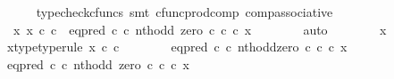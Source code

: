 \begin{isabellebody}
\ \ \ \ \isamarkupfalse%
\ {\isacharparenleft}{\kern0pt}typecheck{\isacharunderscore}{\kern0pt}cfuncs{\isacharcomma}{\kern0pt}\ smt\ cfunc{\isacharunderscore}{\kern0pt}prod{\isacharunderscore}{\kern0pt}comp\ comp{\isacharunderscore}{\kern0pt}associative{}{\isacharparenright}{\kern0pt}\isanewline
\ \ \isamarkupfalse%
\ \isamarkupfalse%
\ {\isachardoublequoteopen}{\isachardot}{\kern0pt}{\isachardot}{\kern0pt}{\isachardot}{\kern0pt}\ {\isacharequal}{\kern0pt}\ {\isasymf}{\isachardoublequoteclose}\isanewline
\ \ \isamarkupfalse%
\ {\isacharminus}{\kern0pt}\isanewline
\ \ \ \ \isamarkupfalse%
\ {\isachardoublequoteopen}{\isasymnexists}\ x{\isachardot}{\kern0pt}\ x\ {\isasymin}\isactrlsub c\ {\isasymnat}\isactrlsub c\ {\isasymand}\ {\isacharparenleft}{\kern0pt}eq{\isacharunderscore}{\kern0pt}pred\ {\isasymnat}\isactrlsub c\ {\isasymcirc}\isactrlsub c\ {\isasymlangle}nth{\isacharunderscore}{\kern0pt}odd{\isacharcomma}{\kern0pt}\ zero\ {\isasymcirc}\isactrlsub c\ {\isasymbeta}\isactrlbsub {\isasymnat}\isactrlsub c\isactrlesub {\isasymrangle}{\isacharparenright}{\kern0pt}\ {\isasymcirc}\isactrlsub c\ x\ {\isacharequal}{\kern0pt}\ {\isasymt}{\isachardoublequoteclose}\isanewline
\ \ \ \ \isamarkupfalse%
\ auto\isanewline
\ \ \ \ \ \ \isamarkupfalse%
\ x\isanewline
\ \ \ \ \ \ \isamarkupfalse%
\ x{\isacharunderscore}{\kern0pt}type{\isacharbrackleft}{\kern0pt}type{\isacharunderscore}{\kern0pt}rule{\isacharbrackright}{\kern0pt}{\isacharcolon}{\kern0pt}\ {\isachardoublequoteopen}x\ {\isasymin}\isactrlsub c\ {\isasymnat}\isactrlsub c{\isachardoublequoteclose}\isanewline
\isanewline
\ \ \ \ \ \ \isamarkupfalse%
\ {\isachardoublequoteopen}{\isacharparenleft}{\kern0pt}eq{\isacharunderscore}{\kern0pt}pred\ {\isasymnat}\isactrlsub c\ {\isasymcirc}\isactrlsub c\ {\isasymlangle}nth{\isacharunderscore}{\kern0pt}odd{\isacharcomma}{\kern0pt}zero\ {\isasymcirc}\isactrlsub c\ {\isasymbeta}\isactrlbsub {\isasymnat}\isactrlsub c\isactrlesub {\isasymrangle}{\isacharparenright}{\kern0pt}\ {\isasymcirc}\isactrlsub c\ x\ {\isacharequal}{\kern0pt}\ {\isasymt}{\isachardoublequoteclose}\isanewline
\ \ \ \ \ \ \isamarkupfalse%
\ \isamarkupfalse%
\ {\isachardoublequoteopen}eq{\isacharunderscore}{\kern0pt}pred\ {\isasymnat}\isactrlsub c\ {\isasymcirc}\isactrlsub c\ {\isasymlangle}nth{\isacharunderscore}{\kern0pt}odd{\isacharcomma}{\kern0pt}\ zero\ {\isasymcirc}\isactrlsub c\ {\isasymbeta}\isactrlbsub {\isasymnat}\isactrlsub c\isactrlesub {\isasymrangle}\ {\isasymcirc}\isactrlsub c\ x\ {\isacharequal}{\kern0pt}\ {\isasymt}{\isachardoublequoteclose}\isanewline

\end{isabellebody}
